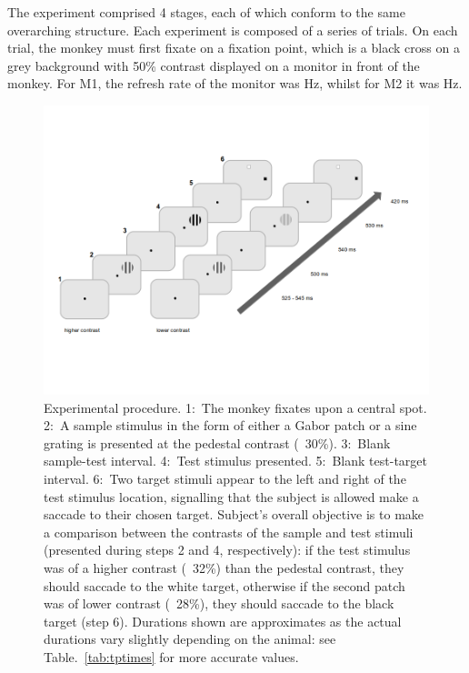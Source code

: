 The experiment comprised 4 stages, each of which conform to the same overarching structure.
Each experiment is composed of a series of trials. On each trial, the monkey must first fixate on a fixation point, which is a black cross on a grey background with 50\% contrast displayed on a monitor in front of the monkey. For M1, the refresh rate of the monitor was \unit[85]{Hz}, whilst for M2 it was \unit[75]{Hz}.

\begin{figure}[htbp]
\begin{center}
\includegraphics[width=\linewidth]{./figs/info/PLtask1.png}
\end{center}
\caption{
Experimental procedure.
1:~The monkey fixates upon a central spot. 2:~A sample stimulus in the form of either a Gabor patch or a sine grating is presented at the pedestal contrast (\eg{}~30\%). 3:~Blank sample-test interval. 4:~Test stimulus presented. 5:~Blank test-target interval. 6:~Two target stimuli appear to the left and right of the test stimulus location, signalling that the subject is allowed make a saccade to their chosen target.
Subject's overall objective is to make a comparison between the contrasts of the sample and test stimuli (presented during steps 2 and 4, respectively): if the test stimulus was of a higher contrast (\eg{}~32\%) than the pedestal contrast, they should saccade to the white target, otherwise if the second patch was of lower contrast (\eg{}~28\%), they should saccade to the black target (step 6).
Durations shown are approximates as the actual durations vary slightly depending on the animal: see Table.~\ref{tab:tptimes} for more accurate values.}
\label{fig:pltask1}
\end{figure}

